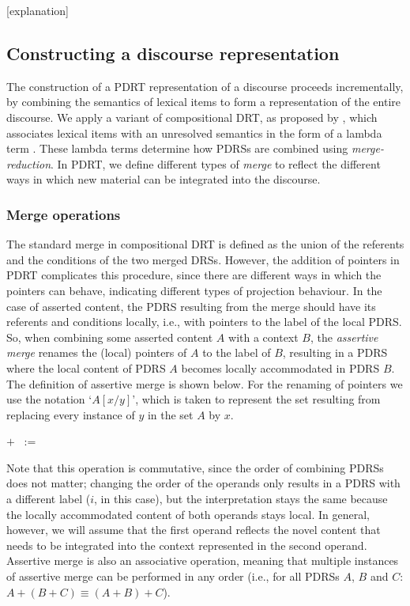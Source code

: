 [explanation]

\subsection{Constructing a discourse representation}\label{sec:composition}

The construction of a PDRT representation of a discourse proceeds
incrementally, by combining the semantics of lexical items to form
a representation of the entire discourse. We apply a variant of
compositional DRT, as proposed by \citet{muskens1996combining}, which
associates lexical items with an unresolved semantics in the form of
a lambda term \citep[see][for a computational
implementation]{bos2003implementing}. These lambda terms determine how PDRSs
are combined using \emph{merge-reduction}. In PDRT, we define different
types of \emph{merge} to reflect the different ways in which new material
can be integrated into the discourse.

\subsubsection{Merge operations}

The standard merge in compositional DRT is defined as the
union of the referents and the conditions of the two merged DRSs. However,
the addition of pointers in PDRT complicates this procedure, since there are
different ways in which the pointers can behave, indicating different types
of projection behaviour.  In the case of asserted content, the PDRS
resulting from the merge should have its referents and conditions locally,
i.e., with pointers to the label of the local PDRS. So, when combining some
asserted content $A$ with a context $B$, the \emph{assertive merge} renames
the (local) pointers of $A$ to the label of $B$, resulting in a PDRS where
the local content of PDRS $A$ becomes locally accommodated in PDRS $B$. The
definition of assertive merge is shown below. For the renaming of pointers
we use the notation `$A[x/y]$', which is taken to represent the set
resulting from replacing every instance of $y$ in the set $A$ by $x$.

\begin{definition}
{\small {} $+$ 
   \ := \ 
 }
\end{definition}

\noindent Note that this operation is commutative, since the order of
combining PDRSs does not matter; changing the order of the operands only
results in a PDRS with a different label ($i$, in this case), but the
interpretation stays the same because the locally accommodated content of
both operands stays local. In general, however, we will assume that the
first operand reflects the novel content that needs to be integrated into
the context represented in the second operand.  Assertive merge is also an
associative operation, meaning that multiple instances of assertive merge can
be performed in any order (i.e., for all PDRSs $A$, $B$ and $C$: $A+(B+C)
\equiv (A+B)+C$).

